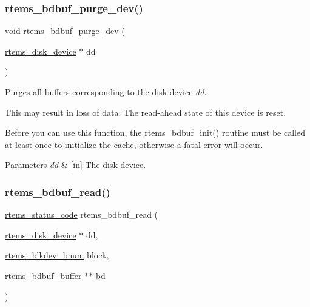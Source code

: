 \subsubsection{\texorpdfstring{rtems\_bdbuf\_purge\_dev()}{rtems\_bdbuf\_purge\_dev()}}
{\footnotesize\ttfamily void rtems\+\_\+bdbuf\+\_\+purge\+\_\+dev (\begin{DoxyParamCaption}\item[{\mbox{\hyperlink{structrtems__disk__device}{rtems\+\_\+disk\+\_\+device}} $\ast$}]{dd }\end{DoxyParamCaption})}



Purges all buffers corresponding to the disk device {\itshape dd}. 

This may result in loss of data. The read-\/ahead state of this device is reset.

Before you can use this function, the \mbox{\hyperlink{group__rtems__bdbuf_gaf19ee8ba7815e24767b6a91e200a78bc}{rtems\+\_\+bdbuf\+\_\+init()}} routine must be called at least once to initialize the cache, otherwise a fatal error will occur.


\begin{DoxyParams}{Parameters}
{\em dd} & \mbox{[}in\mbox{]} The disk device. \\
\hline
\end{DoxyParams}
\mbox{\label{group__rtems__bdbuf_ga8546cefc842eef10cdb5b38a6cead9f7}} 
\subsubsection{\texorpdfstring{rtems\_bdbuf\_read()}{rtems\_bdbuf\_read()}}
{\footnotesize\ttfamily \mbox{\hyperlink{group__ClassicStatus_ga545d41846817eaba6143d52ee4d9e9fe}{rtems\+\_\+status\+\_\+code}} rtems\+\_\+bdbuf\+\_\+read (\begin{DoxyParamCaption}\item[{\mbox{\hyperlink{structrtems__disk__device}{rtems\+\_\+disk\+\_\+device}} $\ast$}]{dd,  }\item[{\mbox{\hyperlink{group__rtems__disk_ga5fbcfd40b657bff6c54d9e393fab3274}{rtems\+\_\+blkdev\+\_\+bnum}}}]{block,  }\item[{\mbox{\hyperlink{structrtems__bdbuf__buffer}{rtems\+\_\+bdbuf\+\_\+buffer}} $\ast$$\ast$}]{bd }\end{DoxyParamCaption})}

